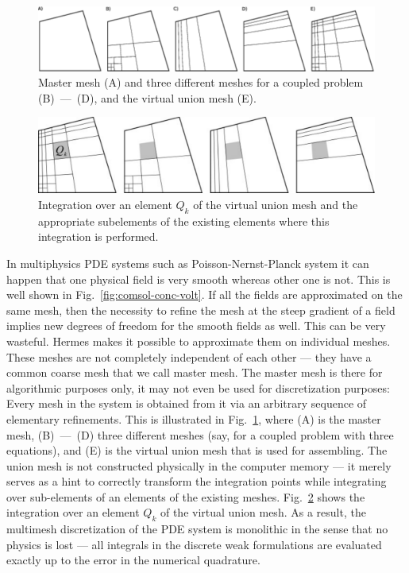 \begin{figure}
  \begin{centering}
  \includegraphics[width=0.5\columnwidth]{multimesh1}
  \caption{\label{fig:multimesh1} Master mesh (A) and 
  three different meshes for a coupled problem (B)~---~(D),
  and the virtual union mesh (E).}
  \end{centering}
\end{figure}
\begin{figure}
  \begin{centering}
  \includegraphics[width=0.5\columnwidth]{multimesh2}
  \caption{\label{fig:multimesh2} Integration over an element
  $Q_k$ of the virtual union mesh and the appropriate subelements
  of the existing elements where this integration is performed.}
  \end{centering}
\end{figure}
In multiphysics PDE systems such as Poisson-Nernst-Planck system it can 
happen that one physical field is very smooth whereas other one is not.
This is well shown in Fig.~\ref{fig:comsol-conc-volt}. 
If all the fields are approximated on the same mesh, then the necessity 
to refine the mesh at the steep gradient of a field implies new degrees 
of freedom for the smooth fields as well. This can be very wasteful.
Hermes makes it possible to approximate them on individual meshes. 
These meshes are not completely independent of each other --- they have 
a common coarse mesh that we call master mesh. The master mesh is 
there for algorithmic purposes only, it may not even be used for 
discretization purposes: Every mesh in the system is obtained from 
it via an arbitrary sequence of elementary refinements. 
This is illustrated in Fig.~\ref{fig:multimesh1}, where (A) is the master mesh, 
(B)~---~(D) three different meshes (say, for a coupled problem with three equations),
and (E) is the virtual union mesh that is used for assembling.
The union mesh is not constructed physically in the computer 
memory --- it merely serves as a hint to correctly transform  the 
integration points while integrating over sub-elements of an elements 
of the existing meshes. Fig.~\ref{fig:multimesh2} shows the integration
over an element $Q_k$ of the virtual union mesh.
As a result, the multimesh discretization of the PDE system is 
monolithic in the sense that no physics is lost --- all integrals 
in the discrete weak formulations are evaluated exactly up to 
the error in the numerical quadrature. 

